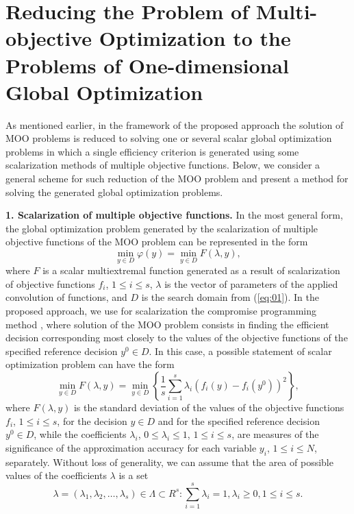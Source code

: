 \documentclass[runningheads]{llncs}
\begin{document}
\section{Reducing the Problem of Multi-objective Optimization to the Problems of One-dimensional Global Optimization} \label{sec:03}

As mentioned earlier, in the framework of the proposed approach the solution of MOO problems is reduced to solving one or several scalar global optimization problems in which a single efficiency criterion is generated using some scalarization methods of multiple objective functions. Below, we consider a general scheme for such reduction of the MOO problem and present a method for solving the generated global optimization problems.

\textbf{1. Scalarization of multiple objective functions.} In the most general form, the global optimization problem generated by the scalarization of multiple objective functions of the MOO problem can be represented in the form
\begin{equation}
\label{eq:04}
\min_{y \in D} {\varphi(y)} = \min_{y \in D} F(\lambda, y),
\end{equation}
where $F$ is a scalar multiextremal function generated as a result of scalarization of objective functions $f_i$, $1 \leq i \leq s$, $\lambda$ is the vector of parameters of the applied convolution of functions, and $D$ is the search domain from (\ref{eq:01}). In the proposed approach, we use for scalarization the compromise programming method \cite{c2,c11}, where solution of the MOO problem consists in finding the efficient decision corresponding most closely to the values of the objective functions of the specified reference decision $y^0 \in D$. In this case, a possible statement of scalar optimization problem can have the form 
\begin{equation}
\label{eq:05}
\min_{y \in D} F(\lambda,y)=\min_{y \in D} \left\{ \frac{1}{s} \sum_{i=1}^s {\lambda_i (f_i (y)-f_i (y^0 ))^2} \right\},
\end{equation}
where $F(\lambda,y)$ is the standard deviation of the values of the objective functions $f_i$, $1 \leq i \leq s$, for the decision $y \in D$ and for the specified reference decision $y^0 \in D$, while the coefficients $\lambda_i$, $0 \leq \lambda_i \leq 1$, $1 \leq i \leq s$, are measures of the significance of the approximation accuracy for each variable $y_i$, $1 \leq i \leq N$, separately. Without loss of generality, we can assume that the area of possible values of the coefficients $\lambda$ is a set 
\begin{equation}
\label{eq:06}
\lambda=(\lambda_1,\lambda_2, \dots, \lambda_s)\in \Lambda \subset R^s: \sum_{i=1}^{s}\lambda_i=1, \lambda_i \geq 0, 1 \leq i \leq s.
\end{equation}
\end{document}
